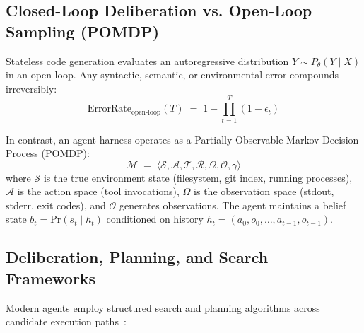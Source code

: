 \subsection{Closed-Loop Deliberation vs. Open-Loop Sampling (POMDP)}

Stateless code generation evaluates an autoregressive distribution $Y \sim P_\theta(Y \mid X)$ in an open loop. Any syntactic, semantic, or environmental error compounds irreversibly:
\begin{equation}
\mathrm{ErrorRate}_{\text{open-loop}}(T) \;=\; 1 - \prod_{t=1}^T (1 - \epsilon_t)
\end{equation}

In contrast, an agent harness operates as a Partially Observable Markov Decision Process (POMDP):
\begin{equation}
\mathcal{M} \;=\; \langle \mathcal{S}, \mathcal{A}, \mathcal{T}, \mathcal{R}, \Omega, \mathcal{O}, \gamma \rangle
\end{equation}
where $\mathcal{S}$ is the true environment state (filesystem, git index, running processes), $\mathcal{A}$ is the action space (tool invocations), $\Omega$ is the observation space (stdout, stderr, exit codes), and $\mathcal{O}$ generates observations. The agent maintains a belief state $b_t = \mathrm{Pr}(s_t \mid h_t)$ conditioned on history $h_t = (a_0, o_0, \dots, a_{t-1}, o_{t-1})$.

\subsection{Deliberation, Planning, and Search Frameworks}

Modern agents employ structured search and planning algorithms across candidate execution paths~:

